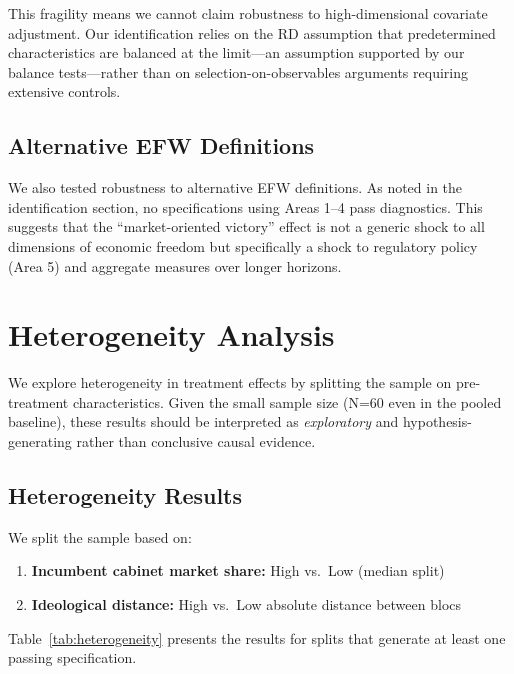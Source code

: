 \documentclass[12pt,a4paper]{article}
\begin{document}
This fragility means we cannot claim robustness to high-dimensional 
covariate adjustment. Our identification relies on the RD assumption 
that predetermined characteristics are balanced at the limit---an assumption 
supported by our balance tests---rather than on selection-on-observables 
arguments requiring extensive controls.

\subsection{Alternative EFW Definitions}

We also tested robustness to alternative EFW definitions. As noted in 
the identification section, no specifications using Areas 1--4 pass 
diagnostics. This suggests that the ``market-oriented victory'' effect 
is not a generic shock to all dimensions of economic freedom but 
specifically a shock to regulatory policy (Area 5) and aggregate measures 
over longer horizons.


\section{Heterogeneity Analysis}
\label{sec:heterogeneity}

We explore heterogeneity in treatment effects by splitting the sample on 
pre-treatment characteristics. Given the small sample size (N=60 even in 
the pooled baseline), these results should be interpreted as 
\textit{exploratory} and hypothesis-generating rather than conclusive 
causal evidence.

\subsection{Heterogeneity Results}

We split the sample based on:
\begin{enumerate}
    \item \textbf{Incumbent cabinet market share:} High vs.\ Low (median split)
    \item \textbf{Ideological distance:} High vs.\ Low absolute distance 
    between blocs
\end{enumerate}

Table~\ref{tab:heterogeneity} presents the results for splits that generate 
at least one passing specification.
\end{document}
